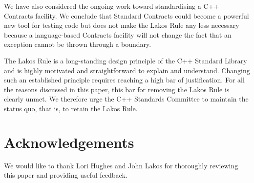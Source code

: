 We have also considered the ongoing work toward standardising a C++ Contracts facility. We conclude that Standard Contracts could become a powerful new tool for testing code but does not make the Lakos Rule any less necessary because a language-based Contracts facility will not change the fact that an exception cannot be thrown through a  boundary.

The Lakos Rule is a long-standing design principle of the C++ Standard Library and is highly motivated and straightforward to explain and understand. Changing such an established principle requires reaching a high bar of justification. For all the reasons discussed in this paper, this bar for removing the Lakos Rule is clearly unmet. We therefore urge the C++ Standards Committee to maintain the status quo, that is, to retain the Lakos Rule.



\section*{Acknowledgements}

We would like to thank Lori Hughes and John Lakos for thoroughly reviewing this paper and providing useful feedback.

\pagebreak %

\renewcommand{\bibname}{References}




